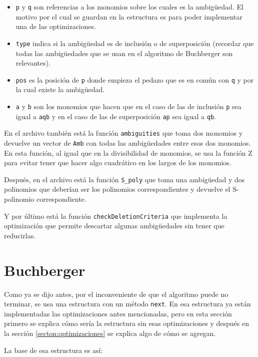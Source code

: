 \documentclass[12pt]{report}
\theoremstyle{customstyle}
\theoremstyle{factstyle}
\begin{document}
\begin{itemize}
  \item \texttt{p} y \texttt{q} son referencias a los monomios sobre los cuales es la ambigüedad. El motivo por el cual se guardan en la estructura es para poder implementar una de las optimizaciones.
  \item \texttt{type} indica si la ambigüedad es de inclusión o de superposición (recordar que todas las ambigüedades que se usan en el algoritmo de Buchberger son relevantes).
  \item \texttt{pos} es la posición de \texttt{p} donde empieza el pedazo que es en común con \texttt{q} y por la cual existe la ambigüedad.
  \item \texttt{a} y \texttt{b} son los monomios que hacen que en el caso de las de inclusión \texttt{p} sea igual a \texttt{aqb} y en el caso de las de superposición \texttt{ap} sea igual a \texttt{qb}. %
\end{itemize}

En el archivo también está la función \texttt{ambiguities} que toma dos monomios y devuelve un vector de \texttt{Amb} con todas las ambigüedades entre esos dos monomios. En esta función, al igual que en la divisibilidad de monomios, se usa la función Z para evitar tener que hacer algo cuadrático en los largos de los monomios.

Después, en el archivo está la función \texttt{S\_poly} que toma una ambigüedad y dos polinomios que deberían ser los polinomios correspondientes y devuelve el S-polinomio correspondiente.

Y por último está la función \texttt{checkDeletionCriteria} que implementa la optimización que permite descartar algunas ambigüedades sin tener que reducirlas.

\section{Buchberger}

Como ya se dijo antes, por el inconveniente de que el algoritmo puede no terminar, se usa una estructura con un método \texttt{next}. En esa estructura ya están implementadas las optimizaciones antes mencionadas, pero en esta sección primero se explica cómo sería la estructura sin esas optimizaciones y después en la sección \cref{secton:optimizaciones} se explica algo de cómo se agregan.

La base de esa estructura es así:
\end{document}
